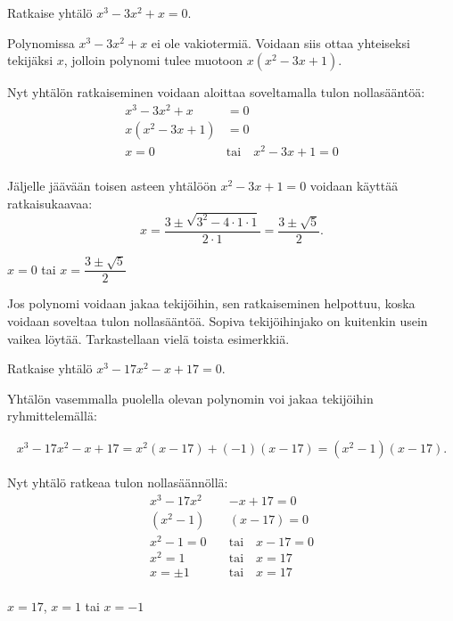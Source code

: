 \begin{esimerkki}
Ratkaise yhtälö $x^3 - 3x^2 + x = 0$.

\begin{esimratk}
Polynomissa $x^3 - 3x^2 + x$ ei ole vakiotermiä. Voidaan siis ottaa yhteiseksi tekijäksi $x$, jolloin polynomi tulee muotoon $x(x^2 - 3x + 1)$. 

Nyt yhtälön ratkaiseminen voidaan aloittaa soveltamalla tulon nollasääntöä:
\begin{align*}
x^3 - 3x^2 + x & =0 \\
x(x^2 - 3x + 1) & =0 \\
x=0 \quad & \text{tai} \quad x^2 - 3x + 1 = 0 \\
\end{align*}

Jäljelle jäävään toisen asteen yhtälöön $x^2 - 3x + 1 = 0$ voidaan käyttää ratkaisukaavaa:
\[
x =\frac{3\pm\sqrt{3^2-4\cdot 1\cdot 1}}{2\cdot 1}=\frac{3\pm \sqrt{5}}{2}.
\]
\end{esimratk}

\begin{esimvast} $x=0$ tai $x=\dfrac{3\pm \sqrt{5}}{2}$
\end{esimvast}
\end{esimerkki}

Jos polynomi voidaan jakaa tekijöihin, sen ratkaiseminen helpottuu, koska voidaan soveltaa tulon nollasääntöä.
Sopiva tekijöihinjako on kuitenkin usein vaikea löytää. Tarkastellaan vielä toista esimerkkiä.

\begin{esimerkki}
Ratkaise yhtälö $x^3-17x^2-x+17 = 0$.

\begin{esimratk}
Yhtälön vasemmalla puolella olevan polynomin voi jakaa tekijöihin ryhmittelemällä:

\begin{align*}
x^3-17x^2-x+17=x^2(x-17)+(-1)(x-17)=(x^2-1)(x-17).
\end{align*}

Nyt yhtälö ratkeaa tulon nollasäännöllä:
\begin{align*}
x^3-17x^2&-x+17=0 \\
(x^2-1)&(x-17)=0 \\
x^2-1 = 0 \quad &\text{tai} \quad x - 17 = 0 \\
x^2 = 1 \quad &\text{tai} \quad x = 17 \\
x =\pm 1 \quad &\text{tai} \quad x = 17 \\
\end{align*}
\end{esimratk}

\begin{esimvast}
$x = 17$, $x = 1$ tai $x=-1$
\end{esimvast}
\end{esimerkki}

